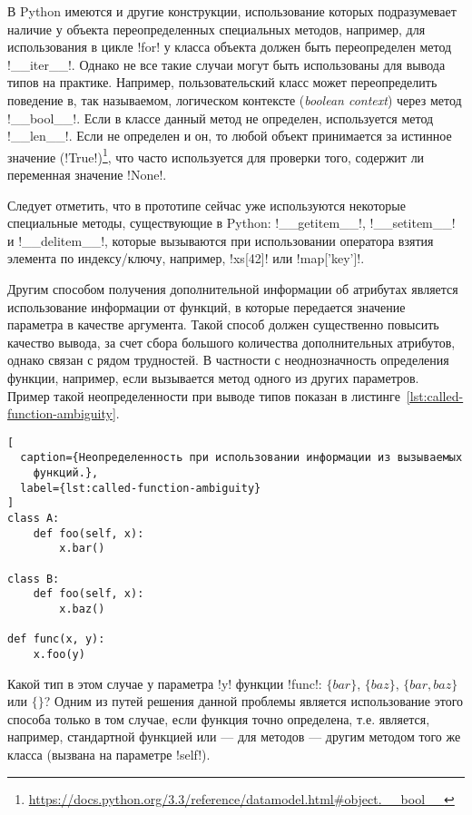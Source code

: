 В Python имеются и другие конструкции, использование которых подразумевает
наличие у объекта переопределенных специальных методов, например, для
использования в цикле !for! у класса объекта должен быть переопределен метод
!__iter__!. Однако не все такие случаи могут быть использованы для вывода типов
на практике. Например, пользовательский класс может переопределить поведение в,
так называемом, логическом контексте (\emph{boolean context}) через метод
!__bool__!. Если в классе данный метод не определен, используется метод
!__len__!. Если не определен и он, то любой объект принимается за истинное
значение
(!True!)\footnote{\url{https://docs.python.org/3.3/reference/datamodel.html\#object.\_\_bool\_\_}},
что часто используется для проверки того, содержит ли переменная значение
!None!.

Следует отметить, что в прототипе сейчас уже используются некоторые специальные
методы, существующие в Python: !__getitem__!, !__setitem__! и !__delitem__!,
которые вызываются при использовании оператора взятия элемента по индексу/ключу,
например, !xs[42]! или !map['key']!.

Другим способом получения дополнительной информации об атрибутах является
использование информации от функций, в которые передается значение параметра в
качестве аргумента. Такой способ должен существенно повысить качество вывода, за
счет сбора большого количества дополнительных атрибутов, однако связан с рядом
трудностей. В частности с неоднозначность определения функции, например, если
вызывается метод одного из других параметров. Пример такой неопределенности при
выводе типов показан в листинге~\ref{lst:called-function-ambiguity}.

\begin{lstlisting}[
  caption={Неопределенность при использовании информации из вызываемых
    функций.},
  label={lst:called-function-ambiguity}
]
class A:
    def foo(self, x):
        x.bar()

class B:
    def foo(self, x):
        x.baz()

def func(x, y):
    x.foo(y)
\end{lstlisting}

Какой тип в этом случае у параметра !y! функции !func!: $\{bar\}$, $\{baz\}$,
$\{bar, baz\}$ или $\{\}$? Одним из путей решения данной проблемы является
использование этого способа только в том случае, если функция точно определена,
т.е. является, например, стандартной функцией или --- для методов --- другим
методом того же класса (вызвана на параметре !self!).

